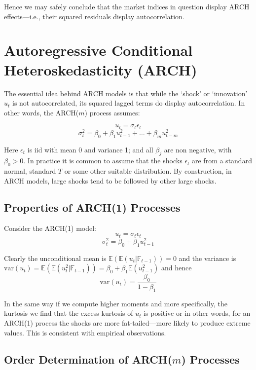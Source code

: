\documentclass[11pt,]{article}
\begin{document}
Hence we may safely conclude that the market indices in question display
ARCH effects---i.e., their squared residuals display autocorrelation.

\section{Autoregressive Conditional Heteroskedasticity
(ARCH)}\label{autoregressive-conditional-heteroskedasticity-arch}

The essential idea behind ARCH models is that while the `shock' or
`innovation' \(u_t\) is not autocorrelated, its squared lagged terms do
display autocorrelation. In other words, the ARCH(\(m\)) process
assumes:

\[u_t = \sigma_t\epsilon_t\]
\[\sigma_t^2 = \beta_0 + \beta_1u_{t-1}^2+\hdots+\beta_mu_{t-m}^2\]

Here \(\epsilon_t\) is iid with mean 0 and variance 1; and all
\(\beta_j\) are non negative, with \(\beta_0>0\). In practice it is
common to assume that the shocks \(\epsilon_t\) are from a standard
normal, standard \(T\) or some other suitable distribution. By
construction, in ARCH models, large shocks tend to be followed by other
large shocks.

\subsection{Properties of ARCH(1)
Processes}\label{properties-of-arch1-processes}

Consider the ARCH(1) model: \[u_t = \sigma_t\epsilon_t\]
\[\sigma^2_t = \beta_0 + \beta_1u_{t-1}^2\]

Clearly the unconditional mean is
\(\mathbb{E}(\mathbb{E}(u_t|\mathbb{F}_{t-1})) = 0\) and the variance is
\(\text{var}(u_t)=\mathbb{E}(\mathbb{E}(u^2_t|\mathbb{F}_{t-1})) = \beta_0+\beta_1\mathbb{E}(u_{t-1}^2)\)
and hence \[\text{var}(u_t) = \frac{\beta_0}{1-\beta_1}\]

In the same way if we compute higher moments and more specifically, the
kurtosis we find that the excess kurtosis of \(u_t\) is positive or in
other words, for an ARCH(1) process the shocks are more
fat-tailed---more likely to produce extreme values. This is consistent
with empirical observations.

\subsection{\texorpdfstring{Order Determination of ARCH(\(m\))
Processes}{Order Determination of ARCH(m) Processes}}\label{order-determination-of-archm-processes}
\end{document}
